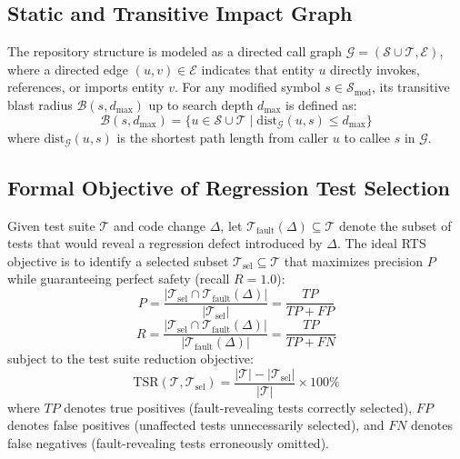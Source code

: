 \documentclass[12pt,onecolumn,draftclsnofoot]{IEEEtran}
\begin{document}
\subsection{Static and Transitive Impact Graph}
The repository structure is modeled as a directed call graph $\mathcal{G} = (\mathcal{S} \cup \mathcal{T}, \mathcal{E})$, where a directed edge $(u, v) \in \mathcal{E}$ indicates that entity $u$ directly invokes, references, or imports entity $v$. For any modified symbol $s \in \mathcal{S}_{\text{mod}}$, its transitive blast radius $\mathcal{B}(s, d_{\text{max}})$ up to search depth $d_{\text{max}}$ is defined as:
\begin{equation}
\mathcal{B}(s, d_{\text{max}}) = \{u \in \mathcal{S} \cup \mathcal{T} \mid \text{dist}_{\mathcal{G}}(u, s) \le d_{\text{max}}\}
\end{equation}
where $\text{dist}_{\mathcal{G}}(u, s)$ is the shortest path length from caller $u$ to callee $s$ in $\mathcal{G}$.

\subsection{Formal Objective of Regression Test Selection}
Given test suite $\mathcal{T}$ and code change $\Delta$, let $\mathcal{T}_{\text{fault}}(\Delta) \subseteq \mathcal{T}$ denote the subset of tests that would reveal a regression defect introduced by $\Delta$. The ideal RTS objective is to identify a selected subset $\mathcal{T}_{\text{sel}} \subseteq \mathcal{T}$ that maximizes precision $P$ while guaranteeing perfect safety (recall $R = 1.0$):
\begin{equation}
\label{eq:precision}
P = \frac{|\mathcal{T}_{\text{sel}} \cap \mathcal{T}_{\text{fault}}(\Delta)|}{|\mathcal{T}_{\text{sel}}|} = \frac{TP}{TP + FP}
\end{equation}
\begin{equation}
\label{eq:recall}
R = \frac{|\mathcal{T}_{\text{sel}} \cap \mathcal{T}_{\text{fault}}(\Delta)|}{|\mathcal{T}_{\text{fault}}(\Delta)|} = \frac{TP}{TP + FN}
\end{equation}
subject to the test suite reduction objective:
\begin{equation}
\label{eq:reduction}
\text{TSR}(\mathcal{T}, \mathcal{T}_{\text{sel}}) = \frac{|\mathcal{T}| - |\mathcal{T}_{\text{sel}}|}{|\mathcal{T}|} \times 100\%
\end{equation}
where $TP$ denotes true positives (fault-revealing tests correctly selected), $FP$ denotes false positives (unaffected tests unnecessarily selected), and $FN$ denotes false negatives (fault-revealing tests erroneously omitted).
\end{document}
